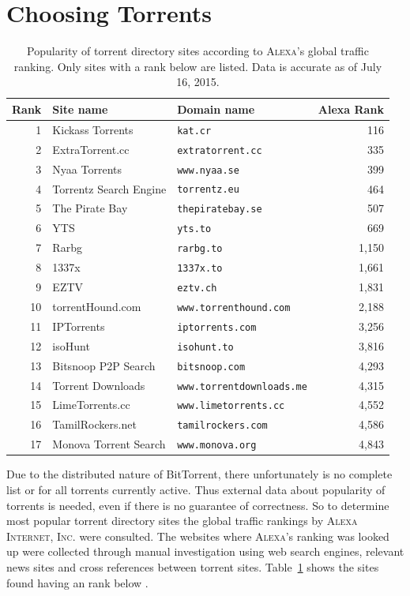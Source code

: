 \documentclass[10pt, a4paper, twoside, headsepline]{scrbook}
\renewcommand{\_}{\origunderscore\allowbreak}
\begin{document}
\section{Choosing Torrents}
\begin{table}[b!]
\centering
\begin{tabular}{rllr}
\toprule
Rank & Site name & Domain name & Alexa Rank \\
\midrule
1 & Kickass Torrents & \texttt{kat.cr} & 116 \\
2 & ExtraTorrent.cc & \texttt{extratorrent.cc} & 335 \\
3 & Nyaa Torrents & \texttt{www.nyaa.se} & 399 \\
4 & Torrentz Search Engine & \texttt{torrentz.eu} & 464 \\
5 & The Pirate Bay & \texttt{thepiratebay.se} & 507 \\
6 & YTS & \texttt{yts.to} & 669 \\
7 & Rarbg & \texttt{rarbg.to} & 1,150 \\
8 & 1337x & \texttt{1337x.to} & 1,661 \\
9 & EZTV & \texttt{eztv.ch} & 1,831 \\
10 & torrentHound.com & \texttt{www.torrenthound.com} & 2,188 \\
11 & IPTorrents & \texttt{iptorrents.com} & 3,256 \\
12 & isoHunt & \texttt{isohunt.to} & 3,816 \\
13 & Bitsnoop P2P Search & \texttt{bitsnoop.com} & 4,293 \\
14 & Torrent Downloads & \texttt{www.torrentdownloads.me} & 4,315 \\
15 & LimeTorrents.cc & \texttt{www.limetorrents.cc} & 4,552 \\
16 & TamilRockers.net & \texttt{tamilrockers.com} & 4,586 \\
17 & Monova Torrent Search & \texttt{www.monova.org} & 4,843 \\
\bottomrule
\end{tabular}
\caption[Popular torrent directory sites according to \textsc{Alexa}]{Popularity of torrent directory sites according to \textsc{Alexa}'s \cite{alexa} global traffic ranking. Only sites with a rank below  are listed. Data is accurate as of July 16, 2015.}
\label{torrentsites}
\end{table}

Due to the distributed nature of BitTorrent, there unfortunately is no complete list or for all torrents currently active. Thus external data about popularity of torrents is needed, even if there is no guarantee of correctness. So to determine most popular torrent directory sites the global traffic rankings by \textsc{Alexa Internet, Inc.} \cite{alexa} were consulted. The websites where \textsc{Alexa}'s ranking was looked up were collected through manual investigation using web search engines, relevant news sites and cross references between torrent sites. Table~\ref{torrentsites} shows the  sites found having an rank below .
\end{document}
